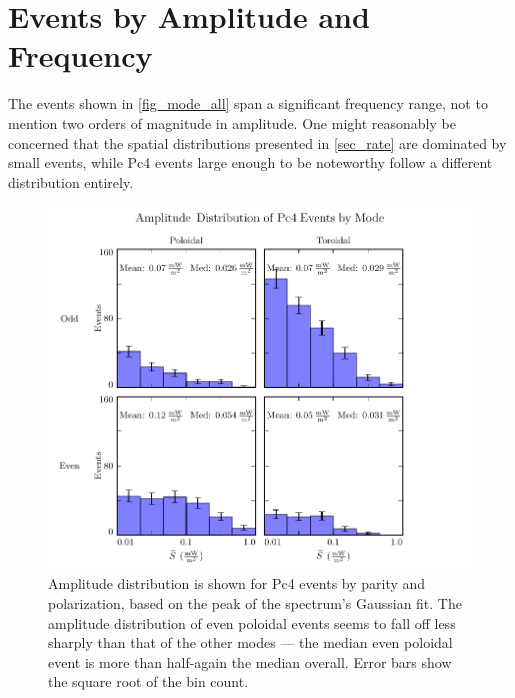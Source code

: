 \section{Events by Amplitude and Frequency}
  \label{sec_amp_f}

The events shown in \cref{fig_mode_all} span a significant frequency range, not
to mention two orders of magnitude in
amplitude. One might reasonably be concerned that the spatial distributions
presented in \cref{sec_rate} are dominated by small events, while Pc4 events
large enough to be noteworthy follow a different distribution entirely. 

\begin{figure}[!htb]
  \centering
  \includegraphics[width=\textwidth]{figures/amp.pdf}
  \caption[Amplitude Distribution of Pc4 Events by Mode]{
    Amplitude distribution is shown for Pc4 events by parity and polarization,
    based on the peak of the spectrum's Gaussian fit. The amplitude
    distribution of even poloidal events seems to fall off less sharply than
    that of the other modes --- the median even poloidal event is more than
    half-again the median overall. 
    Error bars show the square root of the bin count. 
  }
  \label{fig_amp}
\end{figure}



